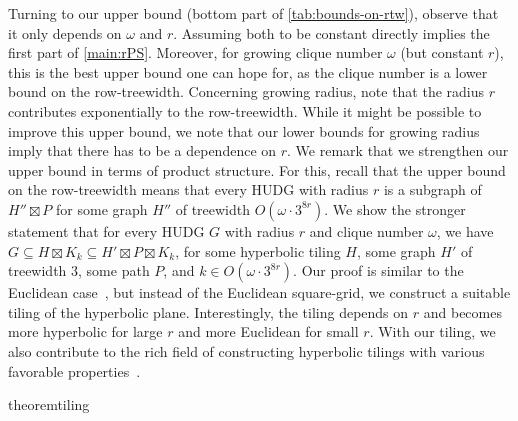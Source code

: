 \documentclass[a4paper,english,cleveref,thm-restate]{lipics-v2021}
\begin{document}
Turning to our upper bound (bottom part of \cref{tab:bounds-on-rtw}), observe that it only depends on $\omega$ and $r$.
Assuming both to be constant directly implies the first part of \cref{main:rPS}.
Moreover, for growing clique number $\omega$ (but constant $r$), this is the best upper bound one can hope for, as the clique number is a lower bound on the row-treewidth.
Concerning growing radius, note that the radius $r$ contributes exponentially to the row-treewidth.
While it might be possible to improve this upper bound, we note that our lower bounds for growing radius imply that there has to be a dependence on $r$.
We remark that we strengthen our upper bound in terms of product structure.
For this, recall that the upper bound on the row-treewidth means that every HUDG with radius $ r $ is a subgraph of $ H'' \boxtimes P $ for some graph $ H'' $ of treewidth $ O(\omega \cdot 3^{8r}) $.
We show the stronger statement that for every HUDG $ G $ with radius $r$ and clique number $\omega$, we have $G \subseteq H \boxtimes K_k \subseteq H' \boxtimes P \boxtimes K_{k}$, for some hyperbolic tiling $ H $, some graph $H'$ of treewidth $3$, some path $P$, and $k \in O(\omega \cdot 3^{8r})$.
Our proof is similar to the Euclidean case~\cite{dvorak_notes_2021}, but instead of the Euclidean square-grid, we construct a suitable tiling of the hyperbolic plane.
Interestingly, the tiling depends on $r$ and becomes more hyperbolic for large $ r $ and more Euclidean for small $ r $.
%
With our tiling, we also contribute to the rich field of constructing hyperbolic tilings with various favorable properties~\cite{Tesselations_Coxeter97,physics_Thurn25,datta_semi_2019}.
\begin{restatable}{theorem}{tiling}\label{lem:tiling}

\end{restatable}
\end{document}
